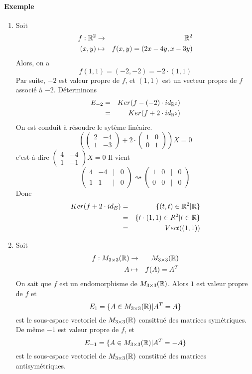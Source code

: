 \paragraph{Exemple}
\begin{enumerate}
  \item Soit 
    \begin{eqnarray*}
      f: \mathbb{R}^2 &\rightarrow& \mathbb{R}^2 \\
      (x, y) &\mapsto& f(x, y) = (2x - 4 y, x -3 y)
    \end{eqnarray*}
    Alors, on a 
    $$f(1, 1) = (-2, -2) = -2 \cdot (1, 1)$$
    Par suite, $-2$ est valeur propre de $f$, et $(1, 1)$ est un vecteur propre de $f$ associé à $-2$. Déterminons 
    \begin{eqnarray*}
      E_{-2} &=& Ker(f-(-2)\cdot id_{\mathbb{R}^2} ) \\
        &=& Ker(f + 2 \cdot id_{\mathbb{R}^2})
    \end{eqnarray*}
    On est conduit à résoudre le sytème linéaire.
    $$\left(\begin{pmatrix}
        2 & -4 \\
        1 & -3
      \end{pmatrix} + 2 \cdot
      \begin{pmatrix}
        1 & 0 \\
        0 & 1
      \end{pmatrix} \right) X = 0$$
    c'est-à-dire $\begin{pmatrix} 4 & -4 \\ 1 & -1 \end{pmatrix} X = 0$ Il vient
    $$\begin{pmatrix} 4 & -4 & \vert & 0 \\ 1 & 1 & \vert & 0 \end{pmatrix} \rightsquigarrow \begin{pmatrix} 1 & 0 & \vert & 0 \\ 0 & 0 & \vert & 0 \end{pmatrix}$$
    Donc 
    \begin{eqnarray*}
      Ker(f + 2 \cdot id_E) &=& \{(t, t) \in \mathbb{R}^2 \vert \mathbb{R} \} \\
        &=& \{t \cdot (1, 1) \in R^2 \vert t \in \mathbb{R} \} \\
        &=& Vect((1, 1))
    \end{eqnarray*}
    
  \item Soit 
    \begin{eqnarray*}
      f: M_{3 \times 3}(\mathbb{R}) &\rightarrow& M_{3 \times 3}(\mathbb{R}) \\
      A &\mapsto& f(A) = A^{T}
    \end{eqnarray*}
    On sait que $f$ est un endomorphisme de $M_{3 \times 3}(\mathbb{R})$. Alors $1$ est valeur propre de $f$ et
    $$E_{1} = \{A \in M_{3 \times 3}(\mathbb{R}) \vert A^{T} = A \}$$
    est le sous-espace vectoriel de $M_{3 \times 3}(\mathbb{R})$ consittué des matrices symétriques. \\
    De même $-1$ est valeur propre de $f$, et
    $$E_{-1} = \{A \in M_{3\times 3}(\mathbb{R}) \vert A^{T} = -A\}$$
    est le sous-espace vectoriel de $M_{3\times 3}(\mathbb{R})$ constitué des matrices antisymétriques.
    

\end{enumerate}
